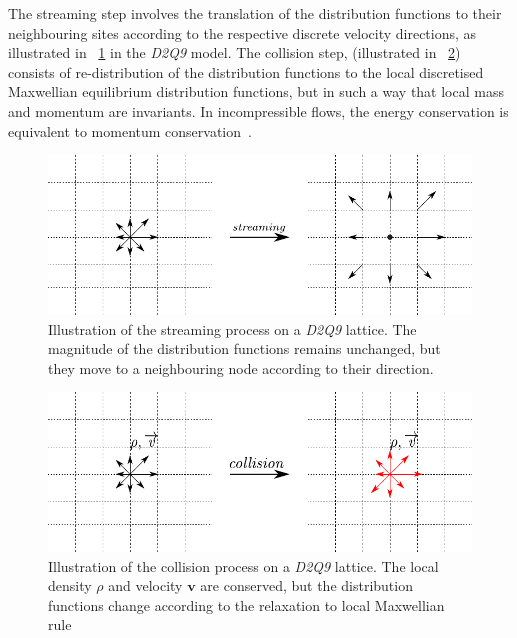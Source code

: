 The streaming step involves the translation of the distribution functions to their neighbouring sites according to the respective discrete velocity directions, as illustrated in ~\cref{fig:stream} in the \textit{D2Q9} model. 
The collision step, (illustrated in ~\cref{fig:collision}) consists of re-distribution of the distribution functions to the local discretised Maxwellian equilibrium distribution functions, but in such a way that local mass and momentum are invariants. In incompressible flows, the energy conservation is equivalent to momentum conservation~\citep{He1997}.
\begin{figure}[htpb]
\centering
\includegraphics{Chapter3/figures/lbm/stream.pdf}
\caption[Illustration of the streaming process on a \textit{D2Q9} lattice]{Illustration of the streaming process on a \textit{D2Q9} lattice. The magnitude of the distribution functions remains unchanged, but they move to a neighbouring node according to their direction.}
\label{fig:stream}
\end{figure}
\begin{figure}[htbp]
\centering
\includegraphics{Chapter3/figures/lbm/collision.pdf}
\caption[Illustration of the collision process on a \textit{D2Q9} lattice]{Illustration of the collision process on a \textit{D2Q9} lattice. The local density $\rho$ and velocity $\mathbf{v}$ are conserved, but the distribution functions change according to the relaxation to local Maxwellian rule}
\label{fig:collision}
\end{figure} 

